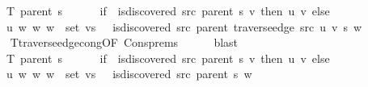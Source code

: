 \begin{isabellebody}
\ \ \ \ \ T\ {\isacharparenleft}{\kern0pt}parent\ s{\isacharparenright}{\kern0pt}\ {\isasymunion}\isanewline
\ \ \ \ \ {\isacharparenleft}{\kern0pt}if\ {\isasymnot}\ is{\isacharunderscore}{\kern0pt}discovered\ src\ {\isacharparenleft}{\kern0pt}parent\ s{\isacharparenright}{\kern0pt}\ v\ then\ {\isacharbraceleft}{\kern0pt}{\isacharparenleft}{\kern0pt}u{\isacharcomma}{\kern0pt}\ v{\isacharparenright}{\kern0pt}{\isacharbraceright}{\kern0pt}\ else\ {\isacharbraceleft}{\kern0pt}{\isacharbraceright}{\kern0pt}{\isacharparenright}{\kern0pt}\ {\isasymunion}\isanewline
\ \ \ \ \ {\isacharbraceleft}{\kern0pt}{\isacharparenleft}{\kern0pt}u{\isacharcomma}{\kern0pt}\ w{\isacharparenright}{\kern0pt}\ {\isacharbar}{\kern0pt}w{\isachardot}{\kern0pt}\ w\ {\isasymin}\ set\ vs\ {\isasymand}\ {\isasymnot}\ is{\isacharunderscore}{\kern0pt}discovered\ src\ {\isacharparenleft}{\kern0pt}parent\ {\isacharparenleft}{\kern0pt}traverse{\isacharunderscore}{\kern0pt}edge\ src\ u\ v\ s{\isacharparenright}{\kern0pt}{\isacharparenright}{\kern0pt}\ w{\isacharbraceright}{\kern0pt}{\isachardoublequoteclose}\isanewline
\ \ \ \ \isamarkupfalse%
\ T{\isacharunderscore}{\kern0pt}traverse{\isacharunderscore}{\kern0pt}edge{\isacharunderscore}{\kern0pt}cong{\isacharbrackleft}{\kern0pt}OF\ Cons{\isachardot}{\kern0pt}prems{\isacharparenleft}{\kern0pt}{}{\isacharparenright}{\kern0pt}{\isacharbrackright}{\kern0pt}\isanewline
\ \ \ \ \isamarkupfalse%
\ blast\isanewline
\ \ \isamarkupfalse%
\ \isamarkupfalse%
\isanewline
\ \ \ \ {\isachardoublequoteopen}{\isachardot}{\kern0pt}{\isachardot}{\kern0pt}{\isachardot}{\kern0pt}\ {\isacharequal}{\kern0pt}\isanewline
\ \ \ \ \ T\ {\isacharparenleft}{\kern0pt}parent\ s{\isacharparenright}{\kern0pt}\ {\isasymunion}\isanewline
\ \ \ \ \ {\isacharparenleft}{\kern0pt}if\ {\isasymnot}\ is{\isacharunderscore}{\kern0pt}discovered\ src\ {\isacharparenleft}{\kern0pt}parent\ s{\isacharparenright}{\kern0pt}\ v\ then\ {\isacharbraceleft}{\kern0pt}{\isacharparenleft}{\kern0pt}u{\isacharcomma}{\kern0pt}\ v{\isacharparenright}{\kern0pt}{\isacharbraceright}{\kern0pt}\ else\ {\isacharbraceleft}{\kern0pt}{\isacharbraceright}{\kern0pt}{\isacharparenright}{\kern0pt}\ {\isasymunion}\isanewline
\ \ \ \ \ {\isacharbraceleft}{\kern0pt}{\isacharparenleft}{\kern0pt}u{\isacharcomma}{\kern0pt}\ w{\isacharparenright}{\kern0pt}\ {\isacharbar}{\kern0pt}w{\isachardot}{\kern0pt}\ w\ {\isasymin}\ set\ vs\ {\isasymand}\ {\isasymnot}\ is{\isacharunderscore}{\kern0pt}discovered\ src\ {\isacharparenleft}{\kern0pt}parent\ s{\isacharparenright}{\kern0pt}\ w{\isacharbraceright}{\kern0pt}{\isachardoublequoteclose}\isanewline

\end{isabellebody}

